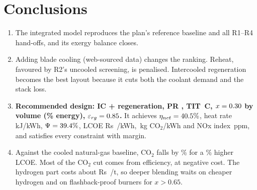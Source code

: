 \documentclass[10.5pt,a4paper]{article}
\newcommand{\Rs}{Rs~}
\begin{document}
\section{Conclusions}
\begin{enumerate}[leftmargin=1.4em,itemsep=2pt]
\item The integrated model reproduces the plan's reference baseline and all R1--R4 hand-offs, and its exergy balance closes.
\item Adding blade cooling (web-sourced data) changes the ranking. Reheat, favoured by R2's uncooled screening, is penalised. Intercooled regeneration becomes the best layout because it cuts both the coolant demand and the stack loss.
\item \textbf{Recommended design: IC + regeneration, PR \finPR, TIT \finTITC\,\textdegree C, $x=0.30$ by volume (\finE\% energy), $\varepsilon_{rg}=0.85$.} It achieves $\eta_{net}=40.5\%$, heat rate \finHR\,kJ/kWh, $\Psi=39.4\%$, LCOE \Rs\finLCOE/kWh, \finCO\,kg CO$_2$/kWh and NOx index \finNOx\,ppm, and satisfies every constraint with margin.
\item Against the cooled natural-gas baseline, CO$_2$ falls by \dCOpct\% for a \dLpct\% higher LCOE. Most of the CO$_2$ cut comes from efficiency, at negative cost. The hydrogen part costs about \Rs\abateHtwo/t, so deeper blending waits on cheaper hydrogen and on flashback-proof burners for $x>0.65$.
\end{enumerate}
\end{document}
